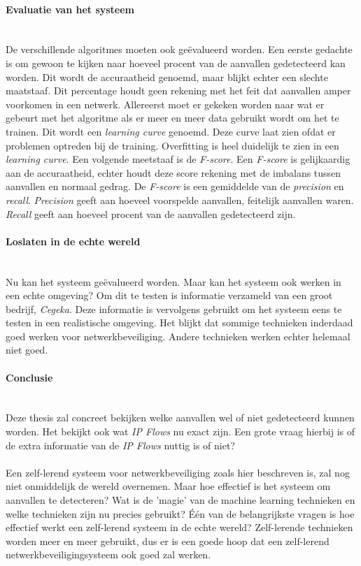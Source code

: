 \documentclass[notitlepage]{article}
\begin{document}
\paragraph{Evaluatie van het systeem}\mbox{}\\
De verschillende algoritmes moeten ook ge\"evalueerd worden. Een eerste gedachte is om gewoon te kijken naar hoeveel procent van de aanvallen gedetecteerd kan worden. Dit wordt de accuraatheid genoemd, maar blijkt echter een slechte maatstaaf. Dit percentage houdt geen rekening met het feit dat aanvallen amper voorkomen in een netwerk. Allereerst moet er gekeken worden naar wat er gebeurt met het algoritme als er meer en meer data gebruikt wordt om het te trainen. Dit wordt een \textit{learning curve} genoemd. Deze curve laat zien ofdat er problemen optreden bij de training. Overfitting is heel duidelijk te zien in een \textit{learning curve}. Een volgende meetstaaf is de \textit{F-score}. Een \textit{F-score} is gelijkaardig aan de  accuraatheid, echter houdt deze score rekening met de imbalans tussen aanvallen en normaal gedrag. De \textit{F-score} is een gemiddelde van de \textit{precision} en \textit{recall}. \textit{Precision} geeft aan hoeveel voorspelde aanvallen, feitelijk aanvallen waren. \textit{Recall} geeft aan hoeveel procent van de aanvallen gedetecteerd zijn.

\paragraph{Loslaten in de echte wereld}\mbox{}\\
Nu kan het systeem ge\"evalueerd worden. Maar kan het systeem ook werken in een echte omgeving? Om dit te testen is informatie verzameld van een groot bedrijf, \textit{Cegeka}. Deze informatie is vervolgens gebruikt om het systeem eens te testen in een realistische omgeving. Het blijkt dat sommige technieken inderdaad goed werken voor netwerkbeveiliging. Andere technieken werken echter helemaal niet goed.

\paragraph{Conclusie}\mbox{}\\
Deze thesis zal concreet bekijken welke aanvallen wel of niet gedetecteerd kunnen worden. Het bekijkt ook wat \textit{IP Flows} nu exact zijn. Een grote vraag hierbij is of de extra informatie van de \textit{IP Flows} nuttig is of niet? \\
\\
Een zelf-lerend systeem voor netwerkbeveiliging zoals hier beschreven is, zal nog niet onmiddelijk de wereld overnemen. Maar hoe effectief is het systeem om aanvallen te detecteren? Wat is de 'magie' van de machine learning technieken en welke technieken zijn nu precies gebruikt? \'E\'en van de belangrijkste vragen is hoe effectief werkt een zelf-lerend systeem in de echte wereld? Zelf-lerende technieken worden meer en meer gebruikt, dus er is een goede hoop dat een zelf-lerend netwerkbeveiligingsysteem ook goed zal werken.
\end{document}
